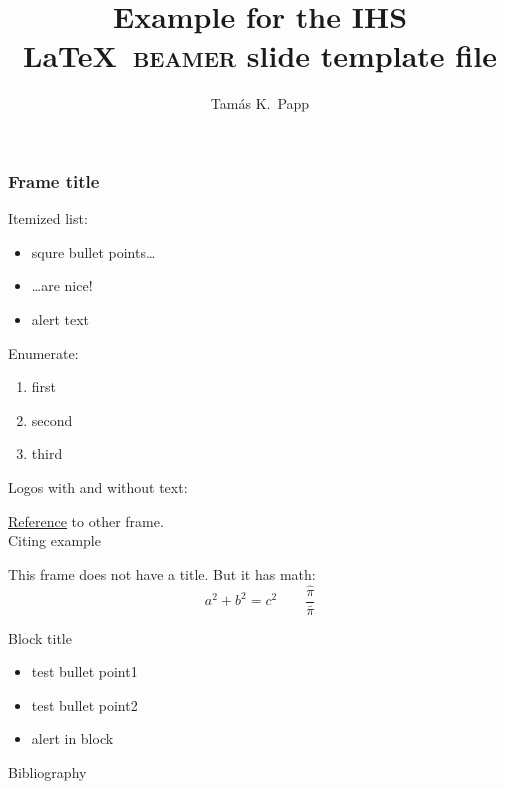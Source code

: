 \documentclass{beamer}
\begin{document}
\title[Short title]{Example for the IHS \LaTeX\ \textsc{beamer} slide template file}
\author[Tam\'as]{Tam\'as K.~Papp}

\begin{frame}[plain]
  \titlepage
\end{frame}

\begin{frame}
  \frametitle{Frame title}

  Itemized list:

  \begin{itemize}
  \item squre bullet points\dots
  \item \dots are nice!
  \item \alert{alert text}
  \end{itemize}

  \bigskip
  
  Enumerate:

  \begin{enumerate}
  \item first
  \item second
  \item third
  \end{enumerate}

  Logos with and without text:
  \begin{center}
    \IHSlogotext[height=2em] \hspace{2em} \IHSlogo[height=2em]
  \end{center}

  \hyperlink{frame:math}{Reference} to other frame. \\
  Citing example \textcite{till17:_beamer}

\end{frame}

\begin{frame}
  \label{frame:math}
  This frame does not have a title.  But it has math:
  \begin{equation*}
    a^2+b^2=c^2 \qquad \frac{\hat\pi}{\bar\pi}
  \end{equation*}

  \begin{block}{Block title}
    \begin{itemize}
    \item test bullet point1
    \item test bullet point2
    \item \alert{alert in block}
    \end{itemize}
  \end{block}

  \bigskip

  \begin{block}{Bibliography}
    \printbibliography
  \end{block}
  
\end{frame}
\end{document}
